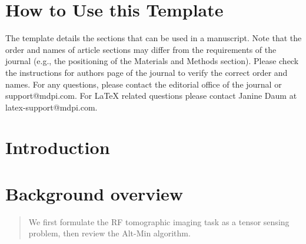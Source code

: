 \documentclass[journal,article,submit,moreauthors,pdftex,10pt,a4paper]{Definitions/mdpi}
\theoremstyle{plain}
\theoremstyle{definition}
\theoremstyle{remark}
\begin{document}

\setcounter{section}{-1} %
\section{How to Use this Template}
The template details the sections that can be used in a manuscript. Note that the order and names of article sections may differ from the requirements of the journal (e.g., the positioning of the Materials and Methods section). Please check the instructions for authors page of the journal to verify the correct order and names. For any questions, please contact the editorial office of the journal or support@mdpi.com. For LaTeX related questions please contact Janine Daum at latex-support@mdpi.com.

\section{Introduction}

 
\section{Background overview}

\begin{quote}
    We first formulate the RF tomographic imaging task as a tensor sensing problem, then review the Alt-Min algorithm. 
\end{quote}

\end{document}

